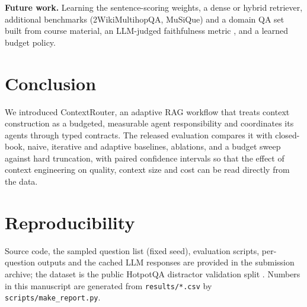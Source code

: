 \documentclass[conference]{IEEEtran}
\begin{document}
\textbf{Future work.} Learning the sentence-scoring weights, a dense or hybrid retriever, additional benchmarks
(2WikiMultihopQA, MuSiQue) and a domain QA set built from course material, an LLM-judged faithfulness metric
\cite{es2024ragas}, and a learned budget policy.

\section{Conclusion}
We introduced ContextRouter, an adaptive RAG workflow that treats context construction as a budgeted, measurable agent
responsibility and coordinates its agents through typed contracts. The released evaluation compares it with
closed-book, naive, iterative and adaptive baselines, ablations, and a budget sweep against hard truncation, with
paired confidence intervals so that the effect of context engineering on quality, context size and cost can be read
directly from the data.

\section*{Reproducibility}
Source code, the sampled question list (fixed seed), evaluation scripts, per-question outputs and the cached LLM
responses are provided in the submission archive; the dataset is the public HotpotQA distractor validation split
\cite{yang2018hotpotqa}. Numbers in this manuscript are generated from \texttt{results/*.csv} by
\texttt{scripts/make\_report.py}.



\end{document}
